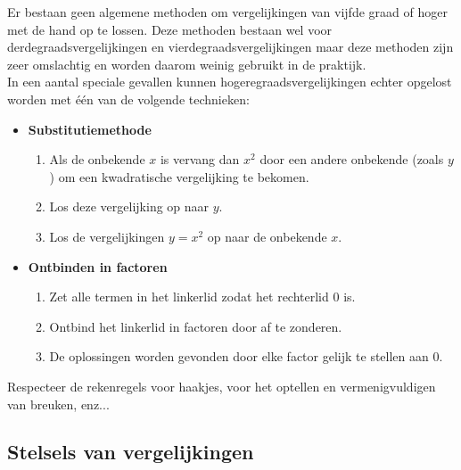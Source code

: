 \begin{ftonthoud}
	Er bestaan geen algemene methoden om vergelijkingen van vijfde graad of hoger met de hand op te lossen. Deze methoden bestaan wel voor derdegraadsvergelijkingen en vierdegraadsvergelijkingen maar deze methoden zijn zeer omslachtig en worden daarom weinig gebruikt in de praktijk.\\

In een aantal speciale gevallen kunnen hogeregraadsvergelijkingen echter opgelost worden met \'{e}\'{e}n van de volgende technieken:
\begin{itemize}
	\item {\bf Substitutiemethode}
\begin{enumerate}
	\item Als de onbekende $x$ is vervang dan $x^2$ door een andere onbekende (zoals $y$) om een kwadratische vergelijking te bekomen.
	\item Los deze vergelijking op naar $y$.
	\item Los de vergelijkingen $y=x^2$ op naar de onbekende $x$.
\end{enumerate}

\item {\bf Ontbinden in factoren}
\begin{enumerate}
	\item Zet alle termen in het linkerlid zodat het rechterlid $0$ is.
	\item Ontbind het linkerlid in factoren door af te zonderen.
	\item De oplossingen worden gevonden door elke factor gelijk te stellen aan $0$.
\end{enumerate}
	
	
\end{itemize}

\begin{opmerking}
	Respecteer de rekenregels voor haakjes, voor het optellen en vermenigvuldigen van breuken, enz...
\end{opmerking}

\end{ftonthoud}


\subsection{Stelsels van vergelijkingen}
%

